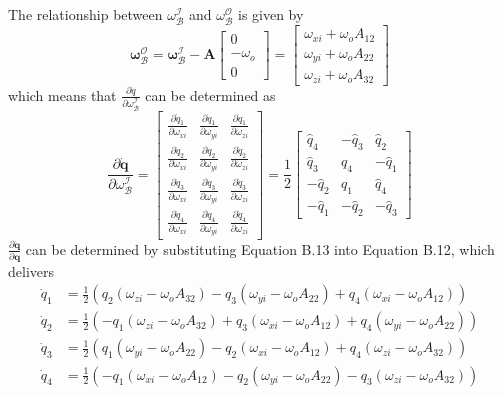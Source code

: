The relationship between $\omega_{\mathcal{B}}^{\mathcal{I}}$ and $\omega_{\mathcal{B}}^{\mathcal{O}}$ is given by
$$
\boldsymbol{\omega}_{\mathcal{B}}^{\mathcal{O}}=\boldsymbol{\omega}_{\mathcal{B}}^{\mathcal{I}}-\mathbf{A}\left[\begin{array}{c}
0 \\
-\omega_{o} \\
0
\end{array}\right]=\left[\begin{array}{c}
\omega_{x i}+\omega_{o} A_{12} \\
\omega_{y i}+\omega_{o} A_{22} \\
\omega_{z i}+\omega_{o} A_{32}
\end{array}\right]
$$
which means that $\frac{\partial \dot{q}}{\partial \omega_{\mathcal{B}}^{\mathcal{I}}}$ can be determined as
$$
\frac{\partial \dot{\mathbf{q}}}{\partial \omega_{\mathcal{B}}^{\mathcal{I}}}=\left[\begin{array}{ccc}
\frac{\partial \dot{q}_{1}}{\partial \omega_{x i}} & \frac{\partial \dot{q}_{1}}{\partial \omega_{y i}} & \frac{\partial \dot{q}_{1}}{\partial \omega_{z i}} \\
\frac{\partial \dot{q}_{2}}{\partial \omega_{x i}} & \frac{\partial \dot{q}_{2}}{\partial \omega_{y i}} & \frac{\partial \dot{q}_{2}}{\partial \omega_{z i}} \\
\frac{\partial \dot{q}_{3}}{\partial \omega_{x i}} & \frac{\partial \dot{q}_{3}}{\partial \omega_{y i}} & \frac{\partial \dot{q}_{3}}{\partial \omega_{z i}} \\
\frac{\partial \dot{q}_{4}}{\partial \omega_{x i}} & \frac{\partial \dot{q}_{4}}{\partial \omega_{y i}} & \frac{\partial \dot{q}_{4}}{\partial \omega_{z i}}
\end{array}\right]=\frac{1}{2}\left[\begin{array}{ccc}
\hat{q}_{4} & -\hat{q}_{3} & \hat{q}_{2} \\
\hat{q}_{3} & \hat{q}_{4} & -\hat{q}_{1} \\
-\hat{q}_{2} & \hat{q}_{1} & \hat{q}_{4} \\
-\hat{q}_{1} & -\hat{q}_{2} & -\hat{q}_{3}
\end{array}\right]
$$
$\frac{\partial \dot{\mathbf{q}}}{\partial \mathbf{q}}$ can be determined by substituting Equation B.13 into Equation B.12, which delivers
$$
\begin{aligned}
\dot{q}_{1} &=\frac{1}{2}\left(q_{2}\left(\omega_{z i}-\omega_{o} A_{32}\right)-q_{3}\left(\omega_{y i}-\omega_{o} A_{22}\right)+q_{4}\left(\omega_{x i}-\omega_{o} A_{12}\right)\right) \\
\dot{q}_{2} &=\frac{1}{2}\left(-q_{1}\left(\omega_{z i}-\omega_{o} A_{32}\right)+q_{3}\left(\omega_{x i}-\omega_{o} A_{12}\right)+q_{4}\left(\omega_{y i}-\omega_{o} A_{22}\right)\right) \\
\dot{q}_{3} &=\frac{1}{2}\left(q_{1}\left(\omega_{y i}-\omega_{o} A_{22}\right)-q_{2}\left(\omega_{x i}-\omega_{o} A_{12}\right)+q_{4}\left(\omega_{z i}-\omega_{o} A_{32}\right)\right) \\
\dot{q}_{4} &=\frac{1}{2}\left(-q_{1}\left(\omega_{x i}-\omega_{o} A_{12}\right)-q_{2}\left(\omega_{y i}-\omega_{o} A_{22}\right)-q_{3}\left(\omega_{z i}-\omega_{o} A_{32}\right)\right)
\end{aligned}
$$
